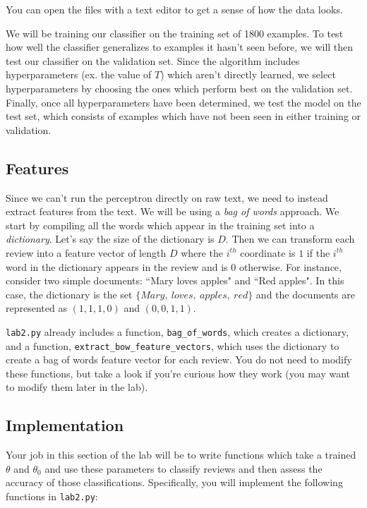 \documentclass{article}
\begin{document}
You can open the files with a text editor to get a sense of how the data looks.

We will be training our classifier on the training set of 1800 examples. To test how well the classifier generalizes to examples it hasn't seen before, we will then test our classifier on the validation set. Since the algorithm includes hyperparameters (ex. the value of $T$) which aren't directly learned, we select hyperparameters by choosing the ones which perform best on the validation set. Finally, once all hyperparameters have been determined, we test the model on the test set, which consists of examples which have not been seen in either training or validation.

\subsection{Features}

Since we can't run the perceptron directly on raw text, we need to instead extract features from the text. We will be using a \textit{bag of words} approach. We start by compiling all the words which appear in the training set into a \textit{dictionary}. Let's say the size of the dictionary is $D$. Then we can transform each review into a feature vector of length $D$ where the $i^{th}$ coordinate is $1$ if the $i^{th}$ word in the dictionary appears in the review and is $0$ otherwise. For instance, consider two simple documents: ``Mary loves apples" and ``Red apples". In this case, the dictionary is the set $\{ Mary,\ loves,\ apples,\ red\}$ and the documents are represented as $(1, 1, 1, 0)$ and $(0, 0, 1, 1)$.

\texttt{lab2.py} already includes a function, \texttt{bag\_of\_words}, which creates a dictionary, and a function, \texttt{extract\_bow\_feature\_vectors}, which uses the dictionary to create a bag of words feature vector for each review. You do not need to modify these functions, but take a look if you're curious how they work (you may want to modify them later in the lab).

\subsection{Implementation}

Your job in this section of the lab will be to write functions which take a trained $\theta$ and $\theta_0$ and use these parameters to classify reviews and then assess the accuracy of those classifications. Specifically, you will implement the following functions in \texttt{lab2.py}:
\end{document}
